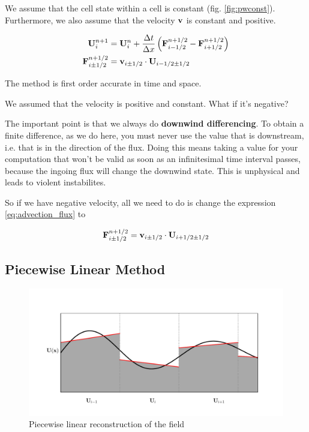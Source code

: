 We assume that the cell state within a cell is constant (fig. \ref{fig:pwconst}).
Furthermore, we also assume that the velocity $\mathbf{v}$ is constant and positive.


\begin{align}
	\mathbf{U}_i ^{n+1} &= 
		\mathbf{U}_i^{n} +  \frac{\Delta t}{\Delta x} \left( \mathbf{F}_{i-1/2}^{n+1/2} - \mathbf{F}_{i+1/2}^{n+1/2} \right) \label{eq:advection_basic}\\ 
	\mathbf{F}_{i\pm1/2}^{n+1/2} &= \mathbf{v}_{i\pm1/2}\cdot \mathbf{U}_{i - 1/2 \pm 1/2} \label{eq:advection_flux}
\end{align}

The method is first order accurate in time and space.





We assumed that the velocity is positive and constant.
What if it's negative?

The important point is that we always do \textbf{downwind differencing}.
To obtain a finite difference, as we do here, you must never use the value that is downstream, i.e. that is in the direction of the flux.
Doing this means taking a value for your computation that won't be valid as soon as an infinitesimal time interval passes, because the ingoing flux will change the downwind state.
This is unphysical and leads to violent instabilites.

So if we have negative velocity, all we need to do is change the expression \ref{eq:advection_flux} to

\begin{equation}
	\mathbf{F}_{i\pm1/2}^{n+1/2} = \mathbf{v}_{i\pm1/2}\cdot \mathbf{U}_{i + 1/2 \pm 1/2}
\end{equation}









\subsection{Piecewise Linear Method}

\begin{figure}[htbp]
	\includegraphics[width=\textwidth]{./images/piecewise_linear.pdf}%
	\caption{Piecewise linear reconstruction of the field
		\label{fig:pwlin}
	}
\end{figure}



